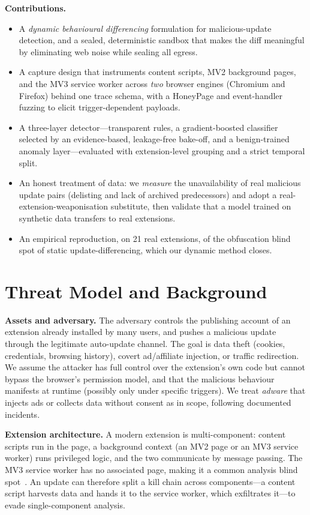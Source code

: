 \documentclass[conference]{IEEEtran}
\begin{document}
\noindent\textbf{Contributions.}
\begin{itemize}
\item A \emph{dynamic behavioural differencing} formulation for malicious-update detection, and a
sealed, deterministic sandbox that makes the diff meaningful by eliminating web noise while
sealing all egress.
\item A capture design that instruments content scripts, MV2 background pages, and the MV3 service
worker across \emph{two} browser engines (Chromium and Firefox) behind one trace schema, with a
HoneyPage and event-handler fuzzing to elicit trigger-dependent payloads.
\item A three-layer detector---transparent rules, a gradient-boosted classifier selected by an
evidence-based, leakage-free bake-off, and a benign-trained anomaly layer---evaluated with
extension-level grouping and a strict temporal split.
\item An honest treatment of data: we \emph{measure} the unavailability of real malicious update
pairs (delisting and lack of archived predecessors) and adopt a real-extension-weaponisation
substitute, then validate that a model trained on synthetic data transfers to real extensions.
\item An empirical reproduction, on 21 real extensions, of the obfuscation blind spot of static
update-differencing, which our dynamic method closes.
\end{itemize}

\section{Threat Model and Background}
\noindent\textbf{Assets and adversary.} The adversary controls the publishing account of an
extension already installed by many users, and pushes a malicious update through the legitimate
auto-update channel. The goal is data theft (cookies, credentials, browsing history), covert
ad/affiliate injection, or traffic redirection. We assume the attacker has full control over the
extension's own code but cannot bypass the browser's permission model, and that the malicious
behaviour manifests at runtime (possibly only under specific triggers). We treat \emph{adware}
that injects ads or collects data without consent as in scope, following documented incidents.

\noindent\textbf{Extension architecture.} A modern extension is multi-component: content scripts
run in the page, a background context (an MV2 page or an MV3 service worker) runs privileged
logic, and the two communicate by message passing. The MV3 service worker has no associated page,
making it a common analysis blind spot~\cite{karami}. An update can therefore split a kill chain
across components---a content script harvests data and hands it to the service worker, which
exfiltrates it---to evade single-component analysis.
\end{document}
